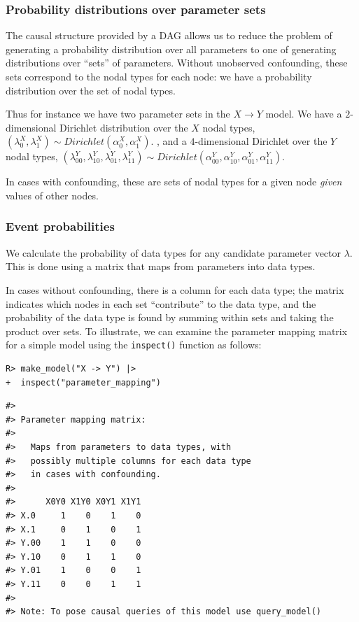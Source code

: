 \documentclass[
  11pt,
  article]{jss}
\begin{document}
\subsubsection{Probability distributions over parameter
sets}\label{probability-distributions-over-parameter-sets}

The causal structure provided by a DAG allows us to reduce the problem
of generating a probability distribution over all parameters to one of
generating distributions over ``sets'' of parameters. Without unobserved
confounding, these sets correspond to the nodal types for each node: we
have a probability distribution over the set of nodal types.

Thus for instance we have two parameter sets in the \(X \rightarrow Y\)
model. We have a \(2\)-dimensional Dirichlet distribution over the \(X\)
nodal types,
\((\lambda^X_0, \lambda^X_1) \sim Dirichlet(\alpha^X_0, \alpha^X_1).\) ,
and a \(4\)-dimensional Dirichlet over the \(Y\) nodal types,
\((\lambda^Y_{00}, \lambda^Y_{10}, \lambda^Y_{01}, \lambda^Y_{11}) \sim Dirichlet(\alpha^Y_{00}, \alpha^Y_{10}, \alpha^Y_{01}, \alpha^Y_{11}).\)

In cases with confounding, these are sets of nodal types for a given
node \emph{given} values of other nodes.

\subsubsection{Event probabilities}\label{event-probabilities}

We calculate the probability of data types for any candidate parameter
vector \(\lambda\). This is done using a matrix that maps from
parameters into data types.

In cases without confounding, there is a column for each data type; the
matrix indicates which nodes in each set ``contribute'' to the data
type, and the probability of the data type is found by summing within
sets and taking the product over sets. To illustrate, we can examine the
parameter mapping matrix for a simple model using the \texttt{inspect()}
function as follows:

\begin{verbatim}
R> make_model("X -> Y") |> 
+  inspect("parameter_mapping") 
\end{verbatim}

\begin{verbatim}
#> 
#> Parameter mapping matrix: 
#> 
#>   Maps from parameters to data types, with
#>   possibly multiple columns for each data type
#>   in cases with confounding. 
#> 
#>      X0Y0 X1Y0 X0Y1 X1Y1
#> X.0     1    0    1    0
#> X.1     0    1    0    1
#> Y.00    1    1    0    0
#> Y.10    0    1    1    0
#> Y.01    1    0    0    1
#> Y.11    0    0    1    1
#> 
#> Note: To pose causal queries of this model use query_model()
\end{verbatim}
\end{document}
